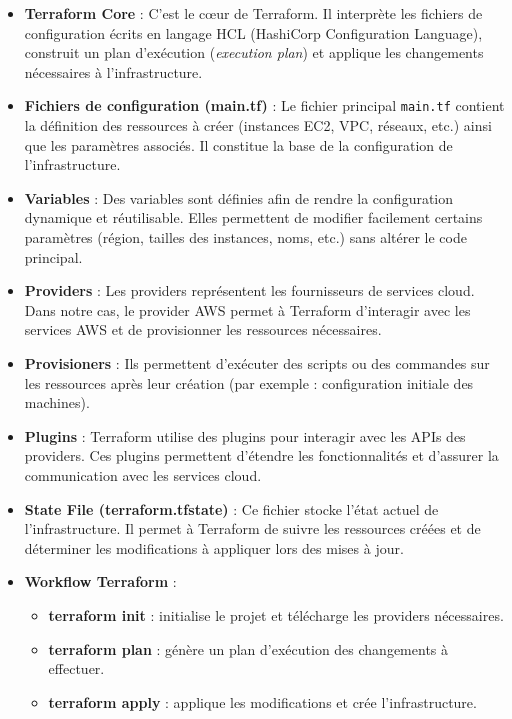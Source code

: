 \begin{itemize}
    \item \textbf{Terraform Core} : C’est le cœur de Terraform. Il interprète les fichiers de configuration écrits en langage HCL (HashiCorp Configuration Language), construit un plan d’exécution (\textit{execution plan}) et applique les changements nécessaires à l’infrastructure.

    \item \textbf{Fichiers de configuration (main.tf)} : Le fichier principal \texttt{main.tf} contient la définition des ressources à créer (instances EC2, VPC, réseaux, etc.) ainsi que les paramètres associés. Il constitue la base de la configuration de l’infrastructure.

    \item \textbf{Variables} : Des variables sont définies afin de rendre la configuration dynamique et réutilisable. Elles permettent de modifier facilement certains paramètres (région, tailles des instances, noms, etc.) sans altérer le code principal.

    \item \textbf{Providers} : Les providers représentent les fournisseurs de services cloud. Dans notre cas, le provider AWS permet à Terraform d’interagir avec les services AWS et de provisionner les ressources nécessaires.

    \item \textbf{Provisioners} : Ils permettent d’exécuter des scripts ou des commandes sur les ressources après leur création (par exemple : configuration initiale des machines).

    \item \textbf{Plugins} : Terraform utilise des plugins pour interagir avec les APIs des providers. Ces plugins permettent d’étendre les fonctionnalités et d’assurer la communication avec les services cloud.

    \item \textbf{State File (terraform.tfstate)} : Ce fichier stocke l’état actuel de l’infrastructure. Il permet à Terraform de suivre les ressources créées et de déterminer les modifications à appliquer lors des mises à jour.

    \item \textbf{Workflow Terraform} :
    \begin{itemize}
        \item \textbf{terraform init} : initialise le projet et télécharge les providers nécessaires.
        \item \textbf{terraform plan} : génère un plan d’exécution des changements à effectuer.
        \item \textbf{terraform apply} : applique les modifications et crée l’infrastructure.
    \end{itemize}

\end{itemize}

